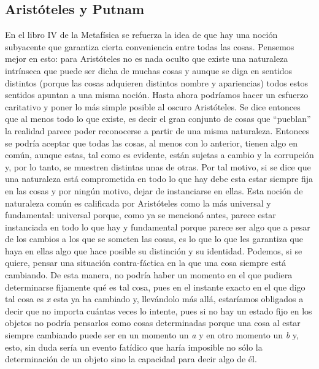 \documentclass[]{book}
\begin{document}
\begin{refsection}
\section*{Aristóteles y Putnam}

En el libro IV de la Metafísica se refuerza la idea de que hay una
noción subyacente que garantiza cierta conveniencia entre todas las
cosas. Pensemos mejor en esto: para Aristóteles no es nada oculto que
existe una naturaleza intrínseca que puede ser dicha de muchas cosas y
aunque se diga en sentidos distintos (porque las cosas adquieren
distintos nombre y apariencias) todos estos sentidos apuntan a una misma
noción. Hasta ahora podríamos hacer un esfuerzo caritativo y poner lo
más simple posible al oscuro Aristóteles. Se dice entonces que al menos
todo lo que existe, es decir el gran conjunto de cosas que ``pueblan''
la realidad parece poder reconocerse a partir de una misma naturaleza.
Entonces se podría aceptar que todas las cosas, al menos con lo
anterior, tienen algo en común, aunque estas, tal como es evidente,
están sujetas a cambio y la corrupción y, por lo tanto, se muestren
distintas unas de otras. Por tal motivo, si se dice que una naturaleza
está comprometida en todo lo que hay debe esta estar siempre fija en las
cosas y por ningún motivo, dejar de instanciarse en ellas. Esta noción
de naturaleza común es calificada por Aristóteles como la más universal
y fundamental: universal porque, como ya se mencionó antes, parece estar
instanciada en todo lo que hay y fundamental porque parece ser algo que
a pesar de los cambios a los que se someten las cosas, es lo que lo que
les garantiza que haya en ellas algo que hace posible su distinción y su
identidad. Podemos, si se quiere, pensar una situación contra-fáctica en
la que una cosa siempre está cambiando. De esta manera, no podría haber
un momento en el que pudiera determinarse fijamente qué es tal cosa,
pues en el instante exacto en el que digo tal cosa es \emph{x} esta ya
ha cambiado y, llevándolo más allá, estaríamos obligados a decir que no
importa cuántas veces lo intente, pues si no hay un estado fijo en los
objetos no podría pensarlos como cosas determinadas porque una cosa al
estar siempre cambiando puede ser en un momento un \emph{a} y en otro
momento un \emph{b} y, esto, sin duda sería un evento fatídico que haría
imposible no sólo la determinación de un objeto sino la capacidad para
decir algo de él.


\end{refsection}
\end{document}
